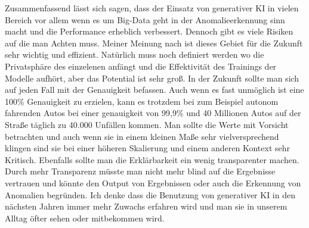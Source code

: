 \nAbsatz
Zusammenfassend lässt sich sagen, dass der Einsatz von generativer KI in vielen Bereich vor allem wenn es um Big-Data geht in der Anomalieerkennung sinn macht und die Performance erheblich verbessert. Dennoch gibt es viele Risiken auf die man Achten muss. Meiner Meinung nach ist dieses Gebiet für die Zukunft sehr wichtig und effizient. Natürlich muss noch definiert werden wo die Privatsphäre des einzelenen anfängt und die Effektivität des Trainings der Modelle aufhört, aber das Potential ist sehr groß. In der Zukunft sollte man sich auf jeden Fall mit der Genauigkeit befassen. Auch wenn es fast unmöglich ist eine 100\% Genauigkeit zu erzielen, kann es trotzdem bei zum Beispiel autonom fahrenden Autos bei einer genauigkeit von 99,9\% und 40 Millionen Autos auf der Straße täglich zu 40.000 Unfällen kommen. Man sollte die Werte mit Vorsicht betrachten und auch wenn sie in einem kleinen Maße sehr vielversprechend klingen sind sie bei einer höheren Skalierung und einem anderen Kontext sehr Kritisch. Ebenfalls sollte man die Erklärbarkeit ein wenig transparenter machen. Durch mehr Transparenz müsste man nicht mehr blind auf die Ergebnisse vertrauen und könnte den Output von Ergebnissen oder auch die Erkennung von Anomalien begründen. Ich denke dass die Benutzung von generativer KI in den nächsten Jahren immer mehr Zuwachs erfahren wird und man sie in unserem Alltag öfter sehen oder mitbekommen wird.    